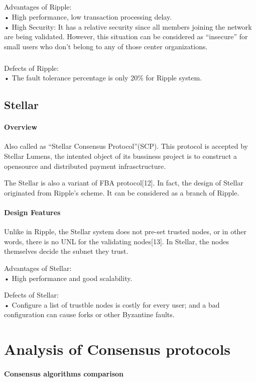 \documentclass[doublespacing]{bmcart}
\begin{document}
\begin{CJK*}{UTF8}{gbsn}
	\subparagraph{} 
Advantages of Ripple:
\\• High performance, low transaction processing delay.
\\• High Security: It has a relative security since all members joining the network are being validated. However, this situation can be considered as ``insecure'' for small users who don't belong to any of those center organizations.
	\subparagraph{} 
Defects of Ripple:	
\\• The fault tolerance percentage is only 20\% for Ripple system.

	
	\subsection{\textbf{Stellar}}
	\paragraph{\textbf{Overview}}
	Also called as ``Stellar Consensus Protocol''(SCP). This protocol is accepted by Stellar Lumens, the intented object of its bussiness project is to construct a opensource and distributed payment infrasctructure.
	
	The Stellar is also a variant of FBA protocol[12]. In fact, the design of Stellar originated from Ripple's scheme. It can be considered as a branch of Ripple.
	\paragraph{\textbf{Design Features}}	
	
	
	 Unlike in Ripple, the Stellar system does not pre-set trusted nodes, or in other words, there is no UNL for the validating nodes[13]. In Stellar, the nodes themselves decide the subnet they trust. 
	 
Advantages of Stellar:
\\• High performance and good scalability.
	 
Defects of Stellar:	
\\• Configure a list of trustble nodes is costly for every user; and a bad configuration can cause forks or other Byzantine faults.

\newpage
\section{Analysis of Consensus protocols}

\paragraph{Consensus algorithms comparison} 


\end{CJK*}
\end{document}
